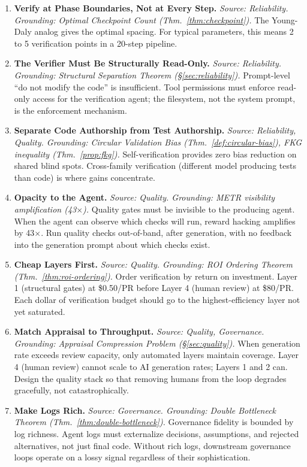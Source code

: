 \documentclass[11pt, a4paper]{googledeepmind}
\begin{document}
\begin{enumerate}[label=\textbf{P\arabic*.}, leftmargin=3em]
\item \textbf{Verify at Phase Boundaries, Not at Every Step.}
\emph{Source: Reliability. Grounding: Optimal Checkpoint Count (Thm.~\ref{thm:checkpoint}).}
The Young-Daly analog gives the optimal spacing. For typical parameters, this means 2 to 5 verification points in a 20-step pipeline.

\item \textbf{The Verifier Must Be Structurally Read-Only.}
\emph{Source: Reliability. Grounding: Structural Separation Theorem (\S\ref{sec:reliability}).}
Prompt-level ``do not modify the code'' is insufficient. Tool permissions must enforce read-only access for the verification agent; the filesystem, not the system prompt, is the enforcement mechanism.

\item \textbf{Separate Code Authorship from Test Authorship.}
\emph{Source: Reliability, Quality. Grounding: Circular Validation Bias (Thm.~\ref{def:circular-bias}), FKG inequality (Thm.~\ref{prop:fkg}).}
Self-verification provides zero bias reduction on shared blind spots. Cross-family verification (different model producing tests than code) is where gains concentrate.

\item \textbf{Opacity to the Agent.}
\emph{Source: Quality. Grounding: METR visibility amplification (43$\times$).}
Quality gates must be invisible to the producing agent. When the agent can observe which checks will run, reward hacking amplifies by 43$\times$. Run quality checks out-of-band, after generation, with no feedback into the generation prompt about which checks exist.

\item \textbf{Cheap Layers First.}
\emph{Source: Quality. Grounding: ROI Ordering Theorem (Thm.~\ref{thm:roi-ordering}).}
Order verification by return on investment. Layer 1 (structural gates) at \$0.50/PR before Layer 4 (human review) at \$80/PR. Each dollar of verification budget should go to the highest-efficiency layer not yet saturated.

\item \textbf{Match Appraisal to Throughput.}
\emph{Source: Quality, Governance. Grounding: Appraisal Compression Problem (\S\ref{sec:quality}).}
When generation rate exceeds review capacity, only automated layers maintain coverage. Layer 4 (human review) cannot scale to AI generation rates; Layers 1 and 2 can. Design the quality stack so that removing humans from the loop degrades gracefully, not catastrophically.

\item \textbf{Make Logs Rich.}
\emph{Source: Governance. Grounding: Double Bottleneck Theorem (Thm.~\ref{thm:double-bottleneck}).}
Governance fidelity is bounded by log richness. Agent logs must externalize decisions, assumptions, and rejected alternatives, not just final code. Without rich logs, downstream governance loops operate on a lossy signal regardless of their sophistication.

\end{enumerate}
\end{document}
